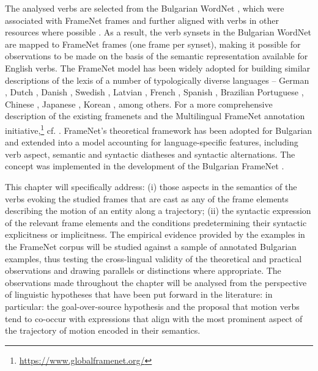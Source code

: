 \documentclass[output=paper,colorlinks,citecolor=brown]{langscibook}
\begin{document}
The analysed verbs are selected from the Bulgarian WordNet \citep{koeva2021-wordnet}, which were associated with FrameNet frames \citep{LesevaStoyanova2020} and further aligned with verbs in other resources where possible \citep{2022-Linked-Resources-towards-}. As a result, the verb synsets in the Bulgarian WordNet are mapped to FrameNet frames (one frame per synset), making it possible for observations to be made on the basis of the semantic representation available for English verbs. The FrameNet model has been widely adopted for building similar descriptions of the lexis of a number of typologically diverse languages -- German \citep{burchardt-etal-2006-salsa}, Dutch \citep{Vossen2018}, Danish \citep{pedersen-etal-2018-danish}, Swedish \citep{Borin-Lars2010-110368}, Latvian \citep{Gruzitis-EtAl:2018:IFNW},  French \citep{candito-etal-2014-developing}, Spanish \citep{Subirats+2009+135+162}, Brazilian Portuguese \citep{TimponiTorrent2018Chapter4T}, Chinese \citep{You2005BuildingCF}, Japanese \citep{Ohara2004TheJF}, Korean \citep{DBLP:conf/i-semantics/HahmKWWSKPHC14}, among others. For a more comprehensive description of the existing framenets and the Multilingual FrameNet annotation initiative,\footnote{\url{https://www.globalframenet.org/}} cf. \citet{Gilardi2018LearningTA}. FrameNet’s theoretical framework has been adopted for Bulgarian and extended into a model accounting for language-specific features, including verb aspect, semantic and syntactic diatheses and syntactic alternations. The concept was implemented in the development of the Bulgarian FrameNet \citep{Koeva2008-framenet, Koeva2010-framenet,svetla2021towards}.

This chapter will specifically address: (i) those aspects in the semantics of the verbs evoking the studied frames that are cast as any of the frame elements describing the motion of an entity along a trajectory; (ii) the syntactic expression of the relevant frame elements and the conditions predetermining their syntactic explicitness or implicitness. The empirical evidence provided by the examples in the FrameNet corpus will be studied against a sample of annotated Bulgarian examples, thus testing the cross-lingual validity of the theoretical and practical observations and drawing parallels or distinctions where appropriate. The observations made throughout the chapter will be analysed from the perspective of linguistic hypotheses that have been put forward in the literature: in particular: the goal-over-source hypothesis and the proposal that motion verbs tend to co-occur with expressions that align with the most prominent aspect of the trajectory of motion encoded in their semantics.
\end{document}
